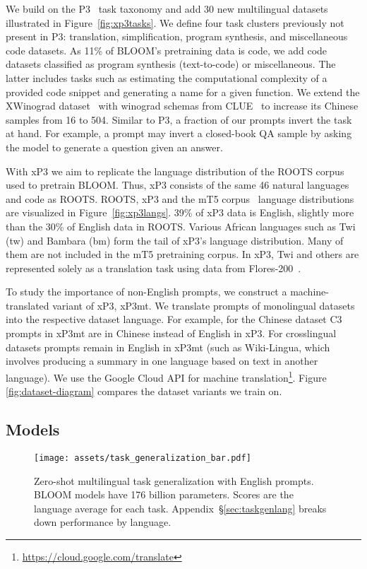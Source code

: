 \documentclass[11pt]{article}
\begin{document}
We build on the P3~\cite{sanh2022multitask} task taxonomy and add 30 new multilingual datasets illustrated in Figure~\ref{fig:xp3tasks}. We define four task clusters previously not present in P3: translation, simplification, program synthesis, and miscellaneous code datasets. As 11\% of BLOOM's pretraining data is code, we add code datasets classified as program synthesis (text-to-code) or miscellaneous. The latter includes tasks such as estimating the computational complexity of a provided code snippet and generating a name for a given function. We extend the XWinograd dataset~\cite{tikhonov2021heads} with winograd schemas from CLUE~\cite{xu2020clue} to increase its Chinese samples from 16 to 504. Similar to P3, a fraction of our prompts invert the task at hand. For example, a prompt may invert a closed-book QA sample by asking the model to generate a question given an answer.

With xP3 we aim to replicate the language distribution of the ROOTS corpus \cite{laurencconbigscience} used to pretrain BLOOM. Thus, xP3 consists of the same 46 natural languages and code as ROOTS. ROOTS, xP3 and the mT5 corpus~\cite{xue2020mt5} language distributions are visualized in Figure~\ref{fig:xp3langs}. 39\% of xP3 data is English, slightly more than the 30\% of English data in ROOTS. Various African languages such as Twi (tw) and Bambara (bm) form the tail of xP3's language distribution. Many of them are not included in the mT5 pretraining corpus. In xP3, Twi and others are represented solely as a translation task using data from Flores-200~\cite{nllb2022}. 

To study the importance of non-English prompts, we construct a machine-translated variant of xP3, xP3mt. We translate prompts of monolingual datasets into the respective dataset language. For example, for the Chinese dataset C3~\cite{sun2020investigating} prompts in xP3mt are in Chinese instead of English in xP3. For crosslingual datasets prompts remain in English in xP3mt (such as Wiki-Lingua, which involves producing a summary in one language based on text in another language). We use the Google Cloud API for machine translation\footnote{\url{https://cloud.google.com/translate}}. Figure \ref{fig:dataset-diagram} compares the dataset variants we train on.


\subsection{Models}
\label{sec:models}

\begin{figure*}[ht]
\texttt{[image: assets/task\_generalization\_bar.pdf]}
\centering
\caption{Zero-shot multilingual task generalization with English prompts. BLOOM models have 176 billion parameters. Scores are the language average for each task. Appendix~\S\ref{sec:taskgenlang} breaks down performance by language.}
\label{fig:taskgen}
\end{figure*}
\end{document}
